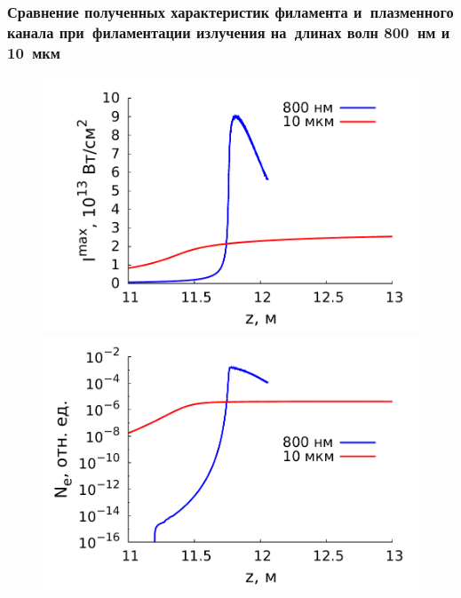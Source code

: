 \documentclass[fullscreen=true,unicode,bookmarks=true]{beamer}
\begin{document}
    \begin{frame}
        \frametitle{\small{Сравнение полученных характеристик филамента и~плазменного канала
                    при~филаментации излучения на~длинах волн 800~нм и 10~мкм}}

        \begin{figure}[H]
            \begin{center}
                \begin{minipage}[h]{0.40\linewidth}
                    \includegraphics[width=0.95\linewidth]{pulses/vs/intensity_cut}
                \end{minipage}
                \hspace{0.10\linewidth}
                \begin{minipage}[h]{0.40\linewidth}
                    \includegraphics[width=0.95\linewidth]{pulses/vs/plasma_cut}
                \end{minipage}
                \\

\end{center}
\end{figure}
\end{frame}
\end{document}
